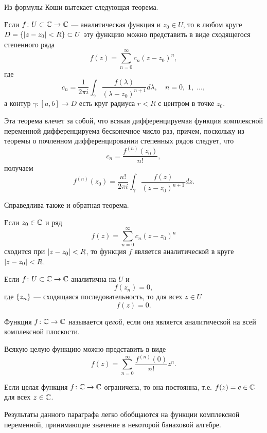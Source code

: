 Из формулы Коши вытекает следующая теорема.
\begin{theorem}\label{th:analytic}
    Если $f \colon U \subset \mathbb{C} \to \mathbb{C}$ --- аналитическая функция и $z_0 \in U$,
    то в любом круге $D = \left\{\left|z-z_0\right| < R\right\} \subset U$ эту функцию можно представить в
    виде сходящегося степенного ряда
    \[ f(z) = \sum_{n=0}^\infty c_n (z - z_0)^n, \]
    где 
    \[ c_n = \dfrac{1}{2\pi i} \int_\gamma \dfrac{f(\lambda)}{(\lambda - z_0)^{n+1}} d \lambda,
        \quad n = 0,\; 1,\; \dotsc, \]
    а контур $\gamma \colon [a, b] \to D$ есть круг радиуса $r < R$ с центром в точке $z_0$. 
\end{theorem}

Эта теорема влечет за собой, что всякая дифференцируемая функция комплексной переменной
дифференцируема бесконечное число раз, причем, поскольку
из теоремы о почленном дифференцировании степенных рядов следует, что
\[ c_n = \frac{f^{(n)}(z_0)}{n!}, \]
получаем
\[ f^{(n)}(z_0) = \dfrac{n!}{2\pi i} 
    \int_\gamma \dfrac{f(z)}{(z - z_0)^{n+1}} d z. \]

Справедлива также и обратная теорема.
\begin{theorem}\label{th:tayloranalytic}
    Если $z_0 \in \mathbb{C}$ и ряд
    \[ f(z) = \sum_{n=0}^\infty c_n (z - z_0)^n \]
    сходится при $\left|z-z_0\right| < R$,
    то функция $f$ является аналитической в круге $\left|z - z_0\right| < R$.
\end{theorem}

\begin{theorem}[единственности]
    Если $f \colon U \subset \mathbb{C} \to \mathbb{C}$ аналитична на $U$ и
    \[ f(z_n) = 0, \]
    где $\left\{z_n\right\}$ --- сходящаяся последовательность, то для всех $z \in U$
    \[ f(z) = 0. \]
\end{theorem}

\begin{definition}
    Функция $f \colon \mathbb{C} \to \mathbb{C}$ называется \emph{целой}, если
    она является аналитической на всей комплексной плоскости.
\end{definition}

Всякую целую функцию можно представить в виде
\[ f(z) = \sum_{n=0}^\infty \frac{f^{(n)}(0)}{n!} z^n. \]

\begin{theorem}[Лиувилля]\label{th:liouville}
    Если целая функция $f \colon \mathbb{C} \to \mathbb{C}$ ограничена, то она постоянна, 
    т.е. $f(z) = c \in \mathbb{C}$ для всех $z \in \mathbb{C}$.
\end{theorem}

Результаты данного параграфа легко обобщаются на функции комплексной переменной, принимающие
значение в некоторой банаховой алгебре.
